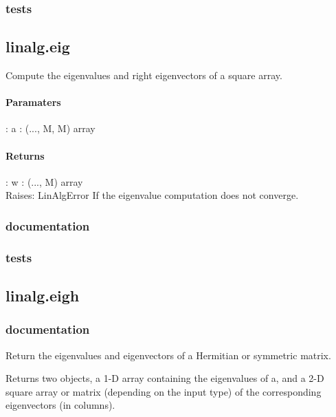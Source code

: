 \subsubsection{tests}


\subsection{linalg.eig}
Compute the eigenvalues and right eigenvectors of a square array.
\paragraph{Paramaters}: 
a : (..., M, M) array\\
\paragraph{Returns}:    
w : (..., M) array\\
Raises: 
LinAlgError
If the eigenvalue computation does not converge.

\subsubsection{documentation}
\subsubsection{tests}
\subsection{linalg.eigh}

\subsubsection{documentation}
Return the eigenvalues and eigenvectors of a Hermitian or symmetric matrix.

Returns two objects, a 1-D array containing the eigenvalues of a, and a 2-D square array or matrix (depending on the input type) of the corresponding eigenvectors (in columns).

